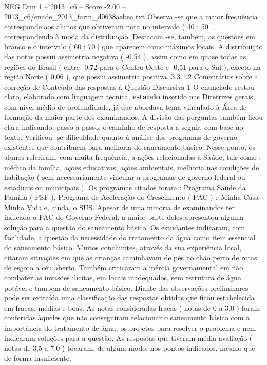 \begin{textsample}{NEG Dim 1 – 2013\_c6 – Score -2.00 – 2013\_c6/enade\_2013\_farm\_d0638aebea.txt}
Observa -se que a maior frequência corresponde aos alunos que obtiveram nota no intervalo ( 40 ; 50 ], correspondendo à moda da distribuição.
Destacam -se, também, as questões em branco e o intervalo ( 60 ; 70 ] que aparecem como máximos locais.
A distribuição das notas possui assimetria negativa ( -0,54 ), assim como em quase todas as regiões do Brasil ( entre -0,72 para o Centro-Oeste e -0,51 para o Sul ), exceto na região Norte ( 0,06 ), que possui assimetria positiva. 3.3.1.2 Comentários sobre a correção de Conteúdo das respostas à Questão Discursiva 1 O enunciado restou claro, elaborado com linguagem técnica, \textbf{estando} inserido nas Diretrizes gerais, com nível médio de profundidade, já que abordava tema vinculado à Área de formação da maior parte dos examinandos.
A divisão das perguntas também ficou clara indicando, passo a passo, o caminho de resposta a seguir, com base no texto.
Verificou -se dificuldade quanto à análise dos programas de governo existentes que contribuem para melhoria do saneamento básico.
Nesse ponto, os alunos referiram, com muita frequência, a ações relacionadas à Saúde, tais como : médico da família, ações educativas, ações ambientais, melhoria nas condições de habitação ( sem necessariamente vincular a programas de governo federal ou estaduais ou municipais ).
Os programas citados foram : Programa Saúde da Família ( PSF ), Programa de Aceleração do Crescimento ( PAC ) e Minha Casa Minha Vida e, ainda, o SUS.
Apesar de uma minoria de examinandos ter indicado o PAC do Governo Federal, a maior parte deles apresentou alguma solução para a questão do saneamento básico.
Os estudantes indicaram, com facilidade, a questão da necessidade do tratamento da água como item essencial do saneamento básico.
Muitos concluintes, através da sua experiência local, citaram situações em que as crianças caminhavam de pés no chão perto de rotas de esgoto a céu aberto.
Também criticaram a inércia governamental em não combater as invasões ilícitas, em locais inadequados, sem estrutura de água potável e também de saneamento básico.
Diante das observações preliminares pode ser extraída uma classificação das respostas obtidas que ficou estabelecida em fracas, médias e boas.
As notas consideradas fracas ( notas de 0 a 3,0 ) foram conferidas àqueles que não conseguiram relacionar o saneamento básico com a importância do tratamento de água, os projetos para resolver o problema e nem indicaram soluções para a questão.
As respostas que tiveram média avaliação ( notas de 3,5 a 7,0 ) tocaram, de algum modo, nos pontos indicados, mesmo que de forma insuficiente.

\end{textsample}
